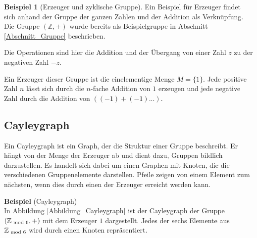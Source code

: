 \documentclass[12pt,a4paper, usenames, dvipsnames]{article}
\theoremstyle{mystyle}
\theoremstyle{definition}
\newtheorem{bsp}{Beispiel}[definition]
\begin{document}
\begin{bsp}[Erzeuger und zyklische Gruppe]

Ein Beispiel für Erzeuger findet sich anhand der Gruppe der ganzen Zahlen und der Addition als Verknüpfung. Die Gruppe $(\mathbb{Z},+)$ wurde bereits als Beispielgruppe in Abschnitt \ref{Abschnitt_Gruppe} beschrieben.

Die Operationen sind hier die Addition und der Übergang von einer Zahl $z$ zu der negativen Zahl $-z$.

Ein Erzeuger dieser Gruppe ist die einelementige Menge $M = \{ 1 \}$. Jede positive Zahl $n$ lässt sich durch die $n$-fache Addition von $1$ erzeugen und jede negative Zahl durch  die Addition von $((-1)+(-1)...)$. 

\end{bsp}
%
%
%
%
%
%
%
%
%
\subsection{Cayleygraph} 
\label{Abschnitt_Cayleygraph}
Ein Cayleygraph ist ein Graph, der die Struktur einer Gruppe beschreibt. Er hängt von der Menge der Erzeuger ab und dient dazu, Gruppen bildlich darzustellen.
Es handelt sich dabei um einen Graphen mit Knoten, die die verschiedenen Gruppenelemente darstellen. Pfeile zeigen von einem Element zum nächsten, wenn dies durch einen der Erzeuger erreicht werden kann. \cite{AT}

\textbf{Beispiel} (Cayleygraph) \\
In Abbildung \ref{Abbildung_Cayleygraph} ist der Cayleygraph der Gruppe $(\mathbb{Z}_{\hspace*{-0.3em}\mod 6}, +)$ mit dem Erzeuger $1$ dargestellt. Jedes der sechs Elemente aus $\mathbb{Z}_{\hspace*{-0.3em}\mod 6}$ wird durch einen Knoten repräsentiert.
\end{document}
